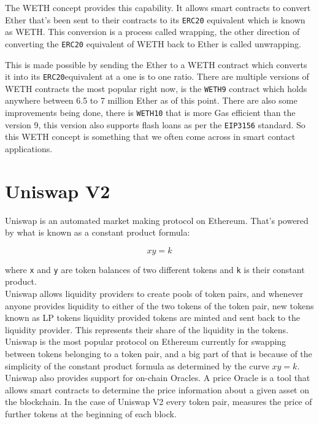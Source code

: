 The WETH concept provides this capability. It allows smart contracts to convert Ether that's been sent to their contracts to its \verb|ERC20| equivalent which is known as WETH. This conversion is a process called wrapping, the other direction of converting the \verb|ERC20| equivalent of WETH back to Ether is called unwrapping. 

This is made possible by sending the Ether to a WETH contract which converts it into its \verb|ERC20|equivalent at a one is to one ratio.  There are multiple versions of WETH contracts the most popular right now, is the \verb|WETH9| \cite{weth9_contract} contract which holds anywhere between 6.5 to 7 million Ether as of this point. There are also some improvements being done, there is \verb|WETH10| that is more Gas efficient than the version 9, this version also supports flash loans as per the \verb|EIP3156| standard. So this WETH concept is something that we often come across in smart contact applications.

\section{Uniswap V2}

Uniswap is an automated market making protocol on Ethereum. That's powered by what is known as a constant product formula:

$$xy=k$$

where \verb|x| and \verb|y| are token balances of two different tokens and \verb|k| is their constant product.\\

Uniswap allows liquidity providers to create pools of token pairs, and whenever anyone provides liquidity to either of the two tokens of the token pair, new tokens known as LP tokens liquidity provided tokens are minted and sent back to the liquidity provider. This represents their share of the liquidity in the tokens.\\ 

Uniswap is the most popular protocol on Ethereum currently for swapping between tokens belonging to a token pair, and a big part of that is because of the simplicity of the constant product formula as determined by the curve $xy=k$.\\

Uniswap also provides support for on-chain Oracles. A price Oracle is a tool that allows smart contracts to determine the price information about a given asset on the blockchain. In the case of Uniswap V2 every token pair, measures the price of further tokens at the beginning of each block. 

